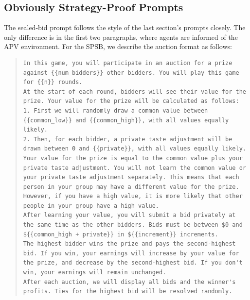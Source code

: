 \documentclass{article} %
\begin{document}
\subsection{Obviously Strategy-Proof Prompts}\label{sec:osp-prompts}
The sealed-bid prompt follows the style of the last section's prompts closely. The only difference is in the first two paragraphs, where agents are informed of the APV environment. For the SPSB, we describe the auction format as follows:
\begin{quote}
\begin{lstlisting}[basicstyle=\ttfamily, breaklines=true, aboveskip = .1em, belowskip = .15em]
In this game, you will participate in an auction for a prize against {{num_bidders}} other bidders. You will play this game for {{n}} rounds.
At the start of each round, bidders will see their value for the prize. Your value for the prize will be calculated as follows:
1. First we will randomly draw a common value between {{common_low}} and {{common_high}}, with all values equally likely.
2. Then, for each bidder, a private taste adjustment will be drawn between 0 and {{private}}, with all values equally likely.
Your value for the prize is equal to the common value plus your private taste adjustment. You will not learn the common value or your private taste adjustment separately. This means that each person in your group may have a different value for the prize. However, if you have a high value, it is more likely that other people in your group have a high value.
After learning your value, you will submit a bid privately at the same time as the other bidders. Bids must be between $0 and ${{common_high + private}} in ${{increment}} increments. 
The highest bidder wins the prize and pays the second-highest bid. If you win, your earnings will increase by your value for the prize, and decrease by the second-highest bid. If you don't win, your earnings will remain unchanged.
After each auction, we will display all bids and the winner's profits. Ties for the highest bid will be resolved randomly.\end{lstlisting}
\end{quote}
\end{document}

